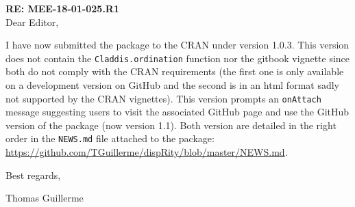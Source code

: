 \documentclass[12pt,letterpaper]{article}
\begin{document}
\textbf{RE: MEE-18-01-025.R1}\\
\bigskip
Dear Editor,\\
\bigskip

I have now submitted the package to the CRAN under version 1.0.3.
This version does not contain the \texttt{Claddis.ordination} function nor the gitbook vignette since both do not comply with the CRAN requirements (the first one is only available on a development version on GitHub and the second is in an html format sadly not supported by the CRAN vignettes).
This version prompts an \texttt{onAttach} message suggesting users to visit the associated GitHub page and use the GitHub version of the package (now version 1.1).
Both version are detailed in the right order in the \texttt{NEWS.md} file attached to the package: \url{https://github.com/TGuillerme/dispRity/blob/master/NEWS.md}.

\bigskip

Best regards,

\bigskip

Thomas Guillerme
\end{document}
